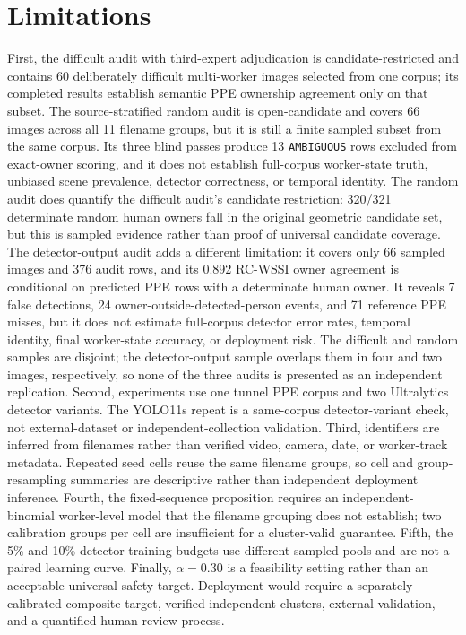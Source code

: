 \documentclass[iicol,pdflatex,sn-mathphys-num]{sn-jnl}
\begin{document}
\section{Limitations}\label{sec:limitations}

First, the difficult audit with third-expert adjudication is candidate-restricted and contains 60 deliberately difficult multi-worker images selected from one corpus; its completed results establish semantic PPE ownership agreement only on that subset. The source-stratified random audit is open-candidate and covers 66 images across all 11 filename groups, but it is still a finite sampled subset from the same corpus. Its three blind passes produce 13 \texttt{AMBIGUOUS} rows excluded from exact-owner scoring, and it does not establish full-corpus worker-state truth, unbiased scene prevalence, detector correctness, or temporal identity. The random audit does quantify the difficult audit's candidate restriction: 320/321 determinate random human owners fall in the original geometric candidate set, but this is sampled evidence rather than proof of universal candidate coverage. The detector-output audit adds a different limitation: it covers only 66 sampled images and 376 audit rows, and its 0.892 RC-WSSI owner agreement is conditional on predicted PPE rows with a determinate human owner. It reveals 7 false detections, 24 owner-outside-detected-person events, and 71 reference PPE misses, but it does not estimate full-corpus detector error rates, temporal identity, final worker-state accuracy, or deployment risk. The difficult and random samples are disjoint; the detector-output sample overlaps them in four and two images, respectively, so none of the three audits is presented as an independent replication. Second, experiments use one tunnel PPE corpus and two Ultralytics detector variants. The YOLO11s repeat is a same-corpus detector-variant check, not external-dataset or independent-collection validation. Third, identifiers are inferred from filenames rather than verified video, camera, date, or worker-track metadata. Repeated seed cells reuse the same filename groups, so cell and group-resampling summaries are descriptive rather than independent deployment inference. Fourth, the fixed-sequence proposition requires an independent-binomial worker-level model that the filename grouping does not establish; two calibration groups per cell are insufficient for a cluster-valid guarantee. Fifth, the 5\% and 10\% detector-training budgets use different sampled pools and are not a paired learning curve. Finally, $\alpha=0.30$ is a feasibility setting rather than an acceptable universal safety target. Deployment would require a separately calibrated composite target, verified independent clusters, external validation, and a quantified human-review process.
\end{document}
